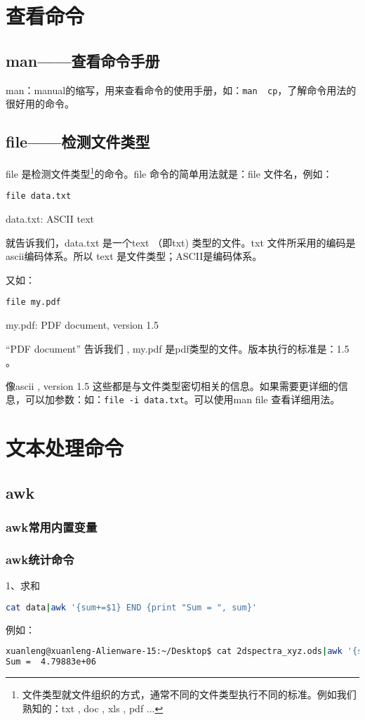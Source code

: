 \section{查看命令}
\subsection{man——查看命令手册}
man：manual的缩写，用来查看命令的使用手册，如：\verb*|man  cp|，了解命令用法的很好用的命令。


\subsection{file——检测文件类型}
 file 是检测文件类型\footnote{文件类型就文件组织的方式，通常不同的文件类型执行不同的标准。例如我们熟知的：txt , doc , xls , pdf ...}的命令。file 命令的简单用法就是：file 文件名，例如：

\verb*|file data.txt|

data.txt: ASCII text

就告诉我们，data.txt 是一个text （即txt) 类型的文件。txt 文件所采用的编码是ascii编码体系。所以 text 是文件类型；ASCII是编码体系。

又如：

\verb*|file my.pdf|

my.pdf: PDF document, version 1.5

“PDF document” 告诉我们 , my.pdf 是pdf类型的文件。版本执行的标准是：1.5 。

像ascii , version 1.5 这些都是与文件类型密切相关的信息。如果需要更详细的信息，可以加参数：如：\verb*|file -i data.txt|。可以使用man file 查看详细用法。


\section{文本处理命令}
\subsection{awk}
\subsubsection{awk常用内置变量}


\subsubsection{awk统计命令}
1、求和
\begin{lstlisting}[language=sh]
cat data|awk '{sum+=$1} END {print "Sum = ", sum}'
\end{lstlisting}
例如：
\begin{lstlisting}[language=sh]
xuanleng@xuanleng-Alienware-15:~/Desktop$ cat 2dspectra_xyz.ods|awk '{sum+=$1} END {print "Sum = ", sum}'
Sum =  4.79883e+06
\end{lstlisting}

